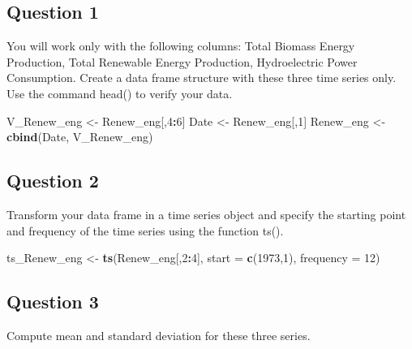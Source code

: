 \documentclass[
]{article}
\newenvironment{Shaded}{\begin{snugshade}}{\end{snugshade}}
\newcommand{\AttributeTok}[1]{\textcolor[rgb]{0.13,0.29,0.53}{#1}}
\newcommand{\DecValTok}[1]{\textcolor[rgb]{0.00,0.00,0.81}{#1}}
\newcommand{\FunctionTok}[1]{\textcolor[rgb]{0.13,0.29,0.53}{\textbf{#1}}}
\newcommand{\NormalTok}[1]{#1}
\newcommand{\OtherTok}[1]{\textcolor[rgb]{0.56,0.35,0.01}{#1}}
\newcommand{\SpecialCharTok}[1]{\textcolor[rgb]{0.81,0.36,0.00}{\textbf{#1}}}
\begin{document}
\hypertarget{question-1}{%
\subsection{Question 1}\label{question-1}}

You will work only with the following columns: Total Biomass Energy
Production, Total Renewable Energy Production, Hydroelectric Power
Consumption. Create a data frame structure with these three time series
only. Use the command head() to verify your data.

\begin{Shaded}
\begin{Highlighting}[]
\NormalTok{V\_Renew\_eng }\OtherTok{\textless{}{-}}\NormalTok{ Renew\_eng[,}\DecValTok{4}\SpecialCharTok{:}\DecValTok{6}\NormalTok{]}
\NormalTok{Date }\OtherTok{\textless{}{-}}\NormalTok{ Renew\_eng[,}\DecValTok{1}\NormalTok{]}
\NormalTok{Renew\_eng }\OtherTok{\textless{}{-}} \FunctionTok{cbind}\NormalTok{(Date, V\_Renew\_eng)}
\end{Highlighting}
\end{Shaded}

\hypertarget{question-2}{%
\subsection{Question 2}\label{question-2}}

Transform your data frame in a time series object and specify the
starting point and frequency of the time series using the function ts().

\begin{Shaded}
\begin{Highlighting}[]
\NormalTok{ts\_Renew\_eng }\OtherTok{\textless{}{-}} \FunctionTok{ts}\NormalTok{(Renew\_eng[,}\DecValTok{2}\SpecialCharTok{:}\DecValTok{4}\NormalTok{], }\AttributeTok{start =} \FunctionTok{c}\NormalTok{(}\DecValTok{1973}\NormalTok{,}\DecValTok{1}\NormalTok{), }\AttributeTok{frequency =} \DecValTok{12}\NormalTok{)}
\end{Highlighting}
\end{Shaded}

\hypertarget{question-3}{%
\subsection{Question 3}\label{question-3}}

Compute mean and standard deviation for these three series.
\end{document}
